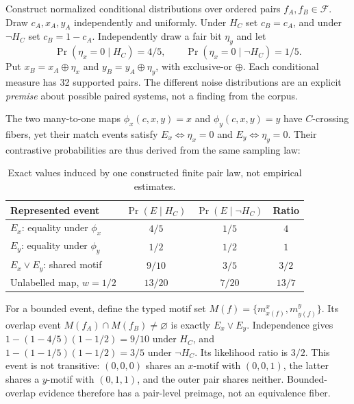 \documentclass[11pt]{article}
\begin{document}
Construct normalized conditional distributions over ordered pairs \(f_A,f_B\in\mathcal F\). Draw \(c_A,x_A,y_A\) independently and uniformly. Under \(H_C\) set \(c_B=c_A\), and under \(\neg H_C\) set \(c_B=1-c_A\). Independently draw a fair bit \(\eta_y\) and let
\[
\Pr(\eta_x=0\mid H_C)=4/5,\qquad
\Pr(\eta_x=0\mid\neg H_C)=1/5.
\]
Put \(x_B=x_A\oplus\eta_x\) and \(y_B=y_A\oplus\eta_y\), with exclusive-or \(\oplus\). Each conditional measure has 32 supported pairs. The different noise distributions are an explicit \emph{premise} about possible paired systems, not a finding from the corpus.

The two many-to-one maps \(\phi_x(c,x,y)=x\) and \(\phi_y(c,x,y)=y\) have \(C\)-crossing fibers, yet their match events satisfy \(E_x\iff\eta_x=0\) and \(E_y\iff\eta_y=0\). Their contrastive probabilities are thus derived from the same sampling law:
\begin{table}[t]
\centering\small
\begin{tabular}{lccc}
\toprule
Represented event & \(\Pr(E\mid H_C)\) & \(\Pr(E\mid\neg H_C)\) & Ratio\\
\midrule
\(E_x\): equality under \(\phi_x\) & \(4/5\) & \(1/5\) & \(4\)\\
\(E_y\): equality under \(\phi_y\) & \(1/2\) & \(1/2\) & \(1\)\\
\(E_x\lor E_y\): shared motif & \(9/10\) & \(3/5\) & \(3/2\)\\
Unlabelled map, \(w=1/2\) & \(13/20\) & \(7/20\) & \(13/7\)\\
\bottomrule
\end{tabular}
\caption{Exact values induced by one constructed finite pair law, not empirical estimates.}
\label{tab:finite-pair}
\end{table}

For a bounded event, define the typed motif set \(M(f)=\{m^x_{x(f)},m^y_{y(f)}\}\). Its overlap event \(M(f_A)\cap M(f_B)\ne\varnothing\) is exactly \(E_x\lor E_y\). Independence gives \(1-(1-4/5)(1-1/2)=9/10\) under \(H_C\), and \(1-(1-1/5)(1-1/2)=3/5\) under \(\neg H_C\). Its likelihood ratio is \(3/2\). This event is not transitive: \((0,0,0)\) shares an \(x\)-motif with \((0,0,1)\), the latter shares a \(y\)-motif with \((0,1,1)\), and the outer pair shares neither. Bounded-overlap evidence therefore has a pair-level preimage, not an equivalence fiber.
\end{document}
